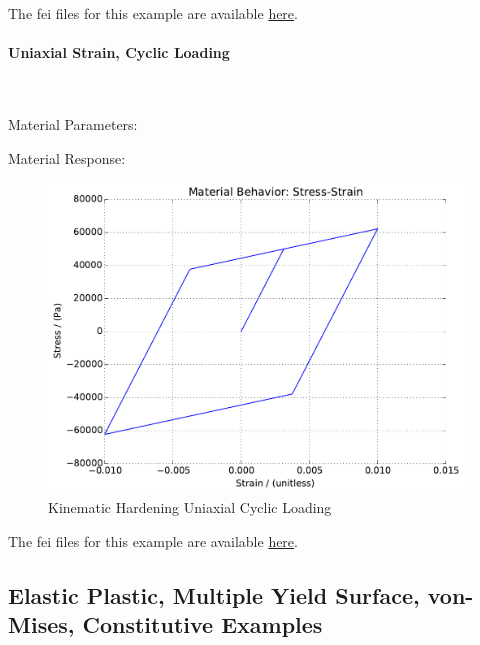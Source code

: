 \documentclass[fleqn,11pt]{article}
\begin{document}
The fei files for this example are available \href{https://github.com/yuan-energy/education_examples/tree/master/fei_examples/elastoplastic_kinematic_hardening/3uniaxial_strain_mono_loading}{here}.

\newpage
\paragraph{Uniaxial Strain, Cyclic Loading} ~

Material Parameters:


Material Response:
\begin{figure}[H]
\begin{center}
\includegraphics[width=11cm]{../fei_examples/elastoplastic_kinematic_hardening/4uniaxial_strain_cyclic_loading/result.pdf}
\caption{
\label{Kinematic Hardening Uniaxial Cyclic Loading}
Kinematic Hardening Uniaxial Cyclic Loading}
\end{center}
\end{figure}

The fei files for this example are available \href{https://github.com/yuan-energy/education_examples/tree/master/fei_examples/elastoplastic_kinematic_hardening/4uniaxial_strain_cyclic_loading}{here}.




\newpage
\subsection{Elastic Plastic, Multiple Yield Surface, von-Mises, Constitutive Examples}
\end{document}
